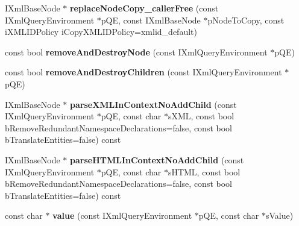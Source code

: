 \begin{DoxyCompactItemize}
\item 
\hypertarget{classgeneral__server_1_1LibXmlBaseNode_a284e423cff4222171f244bc155241bb4}{\-I\-Xml\-Base\-Node $\ast$ {\bfseries replace\-Node\-Copy\-\_\-caller\-Free} (const \-I\-Xml\-Query\-Environment $\ast$p\-Q\-E, const \-I\-Xml\-Base\-Node $\ast$p\-Node\-To\-Copy, const i\-X\-M\-L\-I\-D\-Policy i\-Copy\-X\-M\-L\-I\-D\-Policy=xmlid\-\_\-default)}\label{classgeneral__server_1_1LibXmlBaseNode_a284e423cff4222171f244bc155241bb4}

\item 
\hypertarget{classgeneral__server_1_1LibXmlBaseNode_a1e3c3edd5ba1a9712f76024efe1ec533}{const bool {\bfseries remove\-And\-Destroy\-Node} (const \-I\-Xml\-Query\-Environment $\ast$p\-Q\-E)}\label{classgeneral__server_1_1LibXmlBaseNode_a1e3c3edd5ba1a9712f76024efe1ec533}

\item 
\hypertarget{classgeneral__server_1_1LibXmlBaseNode_ac55b6f808cf919f5c38b97c6ac1a49c2}{const bool {\bfseries remove\-And\-Destroy\-Children} (const \-I\-Xml\-Query\-Environment $\ast$p\-Q\-E)}\label{classgeneral__server_1_1LibXmlBaseNode_ac55b6f808cf919f5c38b97c6ac1a49c2}

\item 
\hypertarget{classgeneral__server_1_1LibXmlBaseNode_a871c90f30c041b4a326553fbc4732408}{\-I\-Xml\-Base\-Node $\ast$ {\bfseries parse\-X\-M\-L\-In\-Context\-No\-Add\-Child} (const \-I\-Xml\-Query\-Environment $\ast$p\-Q\-E, const char $\ast$s\-X\-M\-L, const bool b\-Remove\-Redundant\-Namespace\-Declarations=false, const bool b\-Translate\-Entities=false) const }\label{classgeneral__server_1_1LibXmlBaseNode_a871c90f30c041b4a326553fbc4732408}

\item 
\hypertarget{classgeneral__server_1_1LibXmlBaseNode_a75d9c1f6d5306b766f2f8d9a913f606e}{\-I\-Xml\-Base\-Node $\ast$ {\bfseries parse\-H\-T\-M\-L\-In\-Context\-No\-Add\-Child} (const \-I\-Xml\-Query\-Environment $\ast$p\-Q\-E, const char $\ast$s\-H\-T\-M\-L, const bool b\-Remove\-Redundant\-Namespace\-Declarations=false, const bool b\-Translate\-Entities=false) const }\label{classgeneral__server_1_1LibXmlBaseNode_a75d9c1f6d5306b766f2f8d9a913f606e}

\item 
\hypertarget{classgeneral__server_1_1LibXmlBaseNode_aefe72a0bd98b7d687ba09d0b02be3b68}{const char $\ast$ {\bfseries value} (const \-I\-Xml\-Query\-Environment $\ast$p\-Q\-E, const char $\ast$s\-Value)}\label{classgeneral__server_1_1LibXmlBaseNode_aefe72a0bd98b7d687ba09d0b02be3b68}


\end{DoxyCompactItemize}
